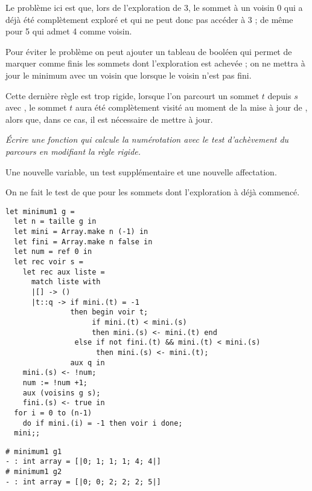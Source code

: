 Le problème ici est que, lors de l'exploration de 3, le sommet à un voisin 0 qui a déjà été complètement exploré et qui ne peut donc pas accéder à 3 ; de même pour 5 qui admet 4 comme voisin.

Pour éviter le problème on peut ajouter un tableau de booléen qui permet de marquer comme finis les sommets dont l'exploration est achevée ; on ne mettra à jour le minimum avec un voisin que lorsque le voisin n'est pas fini. 

Cette dernière règle est trop rigide, lorsque l'on parcourt un sommet $t$ depuis $s$ avec , le sommet $t$ aura été complètement visité au moment de la mise à jour de , alors que, dans ce cas, il est nécessaire de mettre à jour.
\begin{Exercise}\it 
Écrire une fonction  qui calcule la numérotation avec le test d'achèvement du parcours en modifiant la règle rigide.
\end{Exercise} 
\begin{Answer}

Une nouvelle variable, un test supplémentaire et une nouvelle affectation.

On ne fait le test de  que pour les sommets dont l'exploration à déjà commencé.
\begin{lstlisting}
let minimum1 g = 
  let n = taille g in
  let mini = Array.make n (-1) in
  let fini = Array.make n false in
  let num = ref 0 in
  let rec voir s =
    let rec aux liste = 
      match liste with
      |[] -> ()
      |t::q -> if mini.(t) = -1 
               then begin voir t;
                    if mini.(t) < mini.(s) 
                    then mini.(s) <- mini.(t) end
                else if not fini.(t) && mini.(t) < mini.(s) 
                     then mini.(s) <- mini.(t);
               aux q in
    mini.(s) <- !num;
    num := !num +1;
    aux (voisins g s);
    fini.(s) <- true in
  for i = 0 to (n-1) 
    do if mini.(i) = -1 then voir i done;
  mini;;
\end{lstlisting}
\end{Answer} 
\begin{lstlisting}
# minimum1 g1
- : int array = [|0; 1; 1; 1; 4; 4|]
# minimum1 g2
- : int array = [|0; 0; 2; 2; 2; 5|]
\end{lstlisting}
